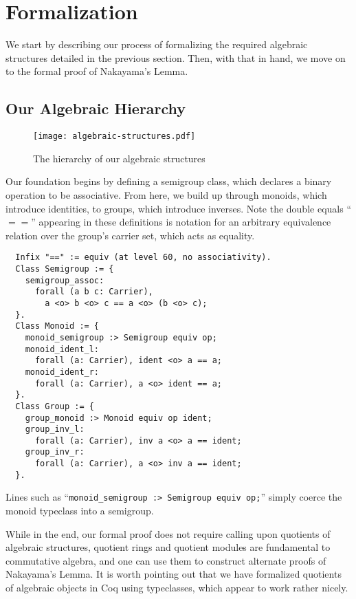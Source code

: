 \documentclass{article}
\begin{document}
\section{Formalization}
We start by describing our process of formalizing the required algebraic
structures detailed in the previous section. Then, with that in hand, we move
on to the formal proof of Nakayama's Lemma.

\subsection{Our Algebraic Hierarchy}
\begin{figure}[t]
  \caption{The hierarchy of our algebraic structures}
  \texttt{[image: algebraic-structures.pdf]}
  \centering
\end{figure}

Our foundation begins by defining a semigroup class, which declares a binary
operation to be associative. From here, we build up through monoids, which
introduce identities, to groups, which introduce inverses. Note the double
equals ``$==$'' appearing in these definitions is notation for an arbitrary
equivalence relation over the group's carrier set, which acts as equality.

\begin{verbatim}
  Infix "==" := equiv (at level 60, no associativity).
  Class Semigroup := {
    semigroup_assoc:
      forall (a b c: Carrier),
        a <o> b <o> c == a <o> (b <o> c);
  }.
  Class Monoid := {
    monoid_semigroup :> Semigroup equiv op;
    monoid_ident_l:
      forall (a: Carrier), ident <o> a == a;
    monoid_ident_r:
      forall (a: Carrier), a <o> ident == a;
  }.
  Class Group := {
    group_monoid :> Monoid equiv op ident;
    group_inv_l:
      forall (a: Carrier), inv a <o> a == ident;
    group_inv_r:
      forall (a: Carrier), a <o> inv a == ident;
  }.
\end{verbatim}
Lines such as  ``\verb|monoid_semigroup :> Semigroup equiv op;|'' simply coerce
the monoid typeclass into a semigroup.

While in the end, our formal proof
does not require calling upon 
 quotients of algebraic
structures, quotient rings and quotient modules are fundamental to commutative
algebra, and one can use them to construct alternate proofs of Nakayama's
Lemma. It is worth pointing out that we have formalized quotients of algebraic
objects in Coq using typeclasses, which appear to work rather nicely. 
\end{document}
